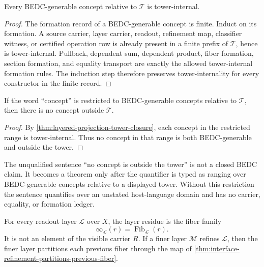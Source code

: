 \begin{theorem}
\label{thm:layered-projection-tower-closure}
Every BEDC-generable concept relative to $\mathcal T$ is tower-internal.
\end{theorem}

\begin{proof}
The formation record of a BEDC-generable concept is finite. Induct on its
formation. A source carrier, layer carrier, readout, refinement map,
classifier witness, or certified operation row is already present in a
finite prefix of $\mathcal T$, hence is tower-internal. Pullback,
dependent sum, dependent product, fiber formation, section formation, and
equality transport are exactly the allowed tower-internal formation
rules. The induction step therefore preserves tower-internality for every
constructor in the finite record.
\end{proof}

\begin{corollary}
\label{cor:layered-projection-relative-no-outside-concept}
If the word ``concept'' is restricted to BEDC-generable concepts relative
to $\mathcal T$, then there is no concept outside $\mathcal T$.
\end{corollary}

\begin{proof}
By \autoref{thm:layered-projection-tower-closure}, each concept in the
restricted range is tower-internal. Thus no concept in that range is both
BEDC-generable and outside the tower.
\end{proof}

\begin{principle}
\label{prin:layered-projection-typed-boundary-outside-concept}
The unqualified sentence ``no concept is outside the tower'' is not a
closed BEDC claim. It becomes a theorem only after the quantifier is
typed as ranging over BEDC-generable concepts relative to a displayed
tower. Without this restriction the sentence quantifies over an
unstated host-language domain and has no carrier, equality, or formation
ledger.
\end{principle}

\begin{theorem}
\label{thm:layered-projection-infinity}
For every readout layer $\mathcal L$ over $X$, the layer residue is the
fiber family
$$
\infty_{\mathcal L}(r)=\operatorname{Fib}_{\mathcal L}(r).
$$
It is not an element of the visible carrier $R$. If a finer layer
$\mathcal M$ refines $\mathcal L$, then the finer layer partitions each
previous fiber through the map of
\autoref{thm:interface-refinement-partitions-previous-fiber}.
\end{theorem}

